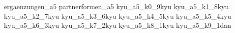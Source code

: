 
\usepackage{import}
\usepackage[backend=biber,style=alphabetic]{biblatex}%

\AtBeginBibliography{\scriptsize}

	{ergaenzungen_a5}\cppb
	{partnerformen_a5}\cppb
	{kyu_a5_k0_9kyu}\cppb
	{kyu_a5_k1_8kyu}\cppb
	{kyu_a5_k2_7kyu}\cppb
	{kyu_a5_k3_6kyu}\cppb
	{kyu_a5_k4_5kyu}\cppb
	{kyu_a5_k5_4kyu}\cppb
	{kyu_a5_k6_3kyu}\cppb
	{kyu_a5_k7_2kyu}\cppb
	{kyu_a5_k8_1kyu}\cppb
	{kyu_a5_k9_1dan}\cppb
	\ClearShipoutPictureFG
	\printbibliography[title={\small Verwendete Literatur und Internetquellen}]


